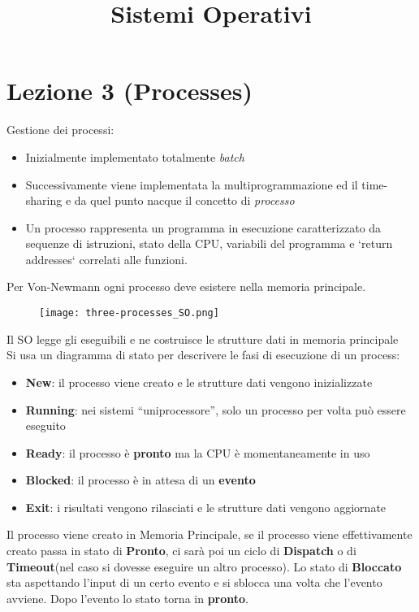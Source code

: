 \documentclass[12pt, a4paper]{article}
\title{Sistemi Operativi}
\date{}
\begin{document}
	
	\section*{Lezione 3 (Processes)}
	
	Gestione dei processi:
	\begin{itemize}
		\item Inizialmente implementato totalmente \textit{batch}
		\item Successivamente viene implementata la multiprogrammazione ed il time-sharing e da quel punto nacque il concetto di \textit{processo}
		\item Un processo rappresenta un programma in esecuzione caratterizzato da sequenze di istruzioni, stato della CPU, variabili del programma e `return  addresses` correlati alle funzioni.
	\end{itemize}
	
	Per Von-Newmann ogni processo deve esistere nella memoria principale. 
	\begin{figure}[!htbp]
		\centering
		\texttt{[image: three-processes\_SO.png]}
		\caption*{}
		\label{fig:three-processes}
	\end{figure}
	
	
	Il SO legge gli eseguibili e ne costruisce le strutture dati in memoria principale \\
	Si usa un diagramma di stato per descrivere le fasi di esecuzione di un process:
	\begin{itemize}
		\item \textbf{New}: il processo viene creato e le strutture dati vengono inizializzate	
		
		\item \textbf{Running}: nei sistemi ``uniprocessore'', solo un processo per volta può essere eseguito
		
		\item \textbf{Ready}: il processo è \textbf{pronto} ma la CPU è momentaneamente in uso
		 
		\item \textbf{Blocked}: il processo è in attesa di un \textbf{evento}
		
		\item \textbf{Exit}: i risultati vengono rilasciati e le strutture dati vengono aggiornate
	\end{itemize}
	Il processo viene creato in Memoria Principale, se il processo viene effettivamente creato passa in stato di \textbf{Pronto}, ci sarà poi un ciclo di \textbf{Dispatch} o di \textbf{Timeout}(nel caso si dovesse eseguire un altro processo). Lo stato di \textbf{Bloccato} sta aspettando l'input di un certo evento e si sblocca una volta che l'evento avviene. Dopo l'evento lo stato torna in \textbf{pronto}.
	
\end{document}
